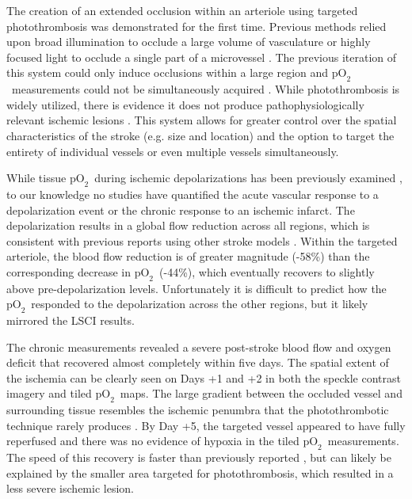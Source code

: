 \documentclass[12pt]{spieman}  %
\newcommand{\pO}{\ensuremath{\text{pO}_2}} 	            %
\begin{document}
\begin{spacing}{2}
The creation of an extended occlusion within an arteriole using targeted photothrombosis was demonstrated for the first time. Previous methods relied upon broad illumination to occlude a large volume of vasculature \cite{Watson:1985bp} or highly focused light to occlude a single part of a microvessel \cite{Schaffer:2006fb}. The previous iteration of this system could only induce occlusions within a large region and \pO\ measurements could not be simultaneously acquired \cite{Ponticorvo:2010uv}. While photothrombosis is widely utilized, there is evidence it does not produce pathophysiologically relevant ischemic lesions \cite{Carmichael:2005gk}. This system allows for greater control over the spatial characteristics of the stroke (e.g. size and location) and the option to target the entirety of individual vessels or even multiple vessels simultaneously.

While tissue \pO\ during ischemic depolarizations has been previously examined \cite{vonBornstadt:2015dj}, to our knowledge no studies have quantified the acute vascular response to a depolarization event or the chronic response to an ischemic infarct. The depolarization results in a global flow reduction across all regions, which is consistent with previous reports using other stroke models \cite{Shin:2006dc,Nakamura:2010wp}. Within the targeted arteriole, the blood flow reduction is of greater magnitude (-58\%) than the corresponding decrease in \pO\ (-44\%), which eventually recovers to slightly above pre-depolarization levels. Unfortunately it is difficult to predict how the \pO\ responded to the depolarization across the other regions, but it likely mirrored the LSCI results.

The chronic measurements revealed a severe post-stroke blood flow and oxygen deficit that recovered almost completely within five days. The spatial extent of the ischemia can be clearly seen on Days +1 and +2 in both the speckle contrast imagery and tiled \pO\ maps. The large gradient between the occluded vessel and surrounding tissue resembles the ischemic penumbra that the photothrombotic technique rarely produces \cite{Carmichael:2005gk}. By Day +5, the targeted vessel appeared to have fully reperfused and there was no evidence of hypoxia in the tiled \pO\ measurements. The speed of this recovery is faster than previously reported \cite{Schrandt:2015gu}, but can likely be explained by the smaller area targeted for photothrombosis, which resulted in a less severe ischemic lesion.




\end{spacing}
\end{document}

